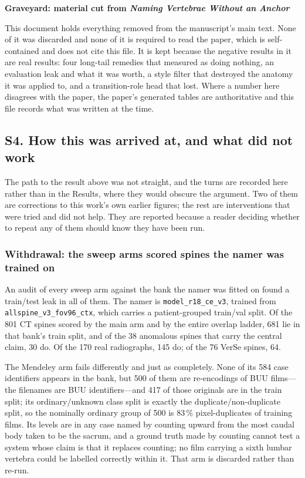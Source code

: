 \documentclass[11pt,letterpaper]{article}
\begin{document}
{\Large\bfseries Graveyard: material cut from \emph{Naming Vertebrae Without an Anchor}}

\medskip\noindent This document holds everything removed from the manuscript's main text. None of it was discarded and none of it is required to read the paper, which is self-contained and does not cite this file. It is kept because the negative results in it are real results: four long-tail remedies that measured as doing nothing, an evaluation leak and what it was worth, a style filter that destroyed the anatomy it was applied to, and a transition-role head that lost. Where a number here disagrees with the paper, the paper's generated tables are authoritative and this file records what was written at the time.

\tableofcontents
\clearpage



\subsection*{S4. How this was arrived at, and what did not work}
The path to the result above was not straight, and the turns are recorded here rather than in the Results, where they would obscure the argument. Two of them are corrections to this work's own earlier figures; the rest are interventions that were tried and did not help. They are reported because a reader deciding whether to repeat any of them should know they have been run.

\subsubsection*{Withdrawal: the sweep arms scored spines the namer was trained on}
An audit of every sweep arm against the bank the namer was fitted on found a train/test leak in all of them. The namer is \texttt{model\_r18\_ce\_v3}, trained from \texttt{allspine\_v3\_fov96\_ctx}, which carries a patient-grouped train/val split. Of the 801 CT spines scored by the main arm and by the entire overlap ladder, 681 lie in that bank's train split, and of the 38 anomalous spines that carry the central claim, 30 do. Of the 170 real radiographs, 145 do; of the 76 VerSe spines, 64.

The Mendeley arm fails differently and just as completely. None of its 584 case identifiers appears in the bank, but 500 of them are re-encodings of BUU films---the filenames are BUU identifiers---and 417 of those originals are in the train split; its ordinary/unknown class split is exactly the duplicate/non-duplicate split, so the nominally ordinary group of 500 is 83\,\% pixel-duplicates of training films. Its levels are in any case named by counting upward from the most caudal body taken to be the sacrum, and a ground truth made by counting cannot test a system whose claim is that it replaces counting; no film carrying a sixth lumbar vertebra could be labelled correctly within it. That arm is discarded rather than re-run.
\end{document}

